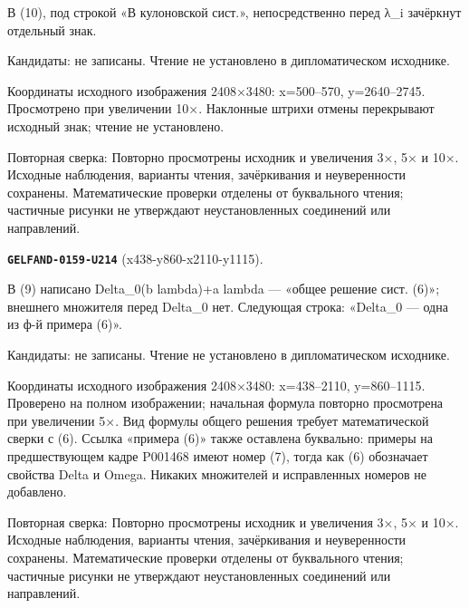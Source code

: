 В (10), под строкой «В кулоновской сист.», непосредственно перед λ\_i зачёркнут отдельный знак.\par
Кандидаты: не записаны. Чтение не установлено в дипломатическом исходнике.\par
Координаты исходного изображения 2408×3480: x=500–570, y=2640–2745. Просмотрено при увеличении 10×. Наклонные штрихи отмены перекрывают исходный знак; чтение не установлено.\par
Повторная сверка: Повторно просмотрены исходник и увеличения 3×, 5× и 10×. Исходные наблюдения, варианты чтения, зачёркивания и неуверенности сохранены. Математические проверки отделены от буквального чтения; частичные рисунки не утверждают неустановленных соединений или направлений.\par\medskip
\par\noindent\leavevmode{}\label{GELFAND-0159-U214}\label{GELFAND-P001469:x438-y860-x2110-y1115}\textbf{\texttt{GELFAND-0159-U214}} (x438-y860-x2110-y1115).\nopagebreak[4]\par
В (9) написано Delta\_0(b lambda)+a lambda — «общее решение сист. (6)»; внешнего множителя перед Delta\_0 нет. Следующая строка: «Delta\_0 — одна из ф-й примера (6)».\par
Кандидаты: не записаны. Чтение не установлено в дипломатическом исходнике.\par
Координаты исходного изображения 2408×3480: x=438–2110, y=860–1115. Проверено на полном изображении; начальная формула повторно просмотрена при увеличении 5×. Вид формулы общего решения требует математической сверки с (6). Ссылка «примера (6)» также оставлена буквально: примеры на предшествующем кадре P001468 имеют номер (7), тогда как (6) обозначает свойства Delta и Omega. Никаких множителей и исправленных номеров не добавлено.\par
Повторная сверка: Повторно просмотрены исходник и увеличения 3×, 5× и 10×. Исходные наблюдения, варианты чтения, зачёркивания и неуверенности сохранены. Математические проверки отделены от буквального чтения; частичные рисунки не утверждают неустановленных соединений или направлений.\par\medskip
